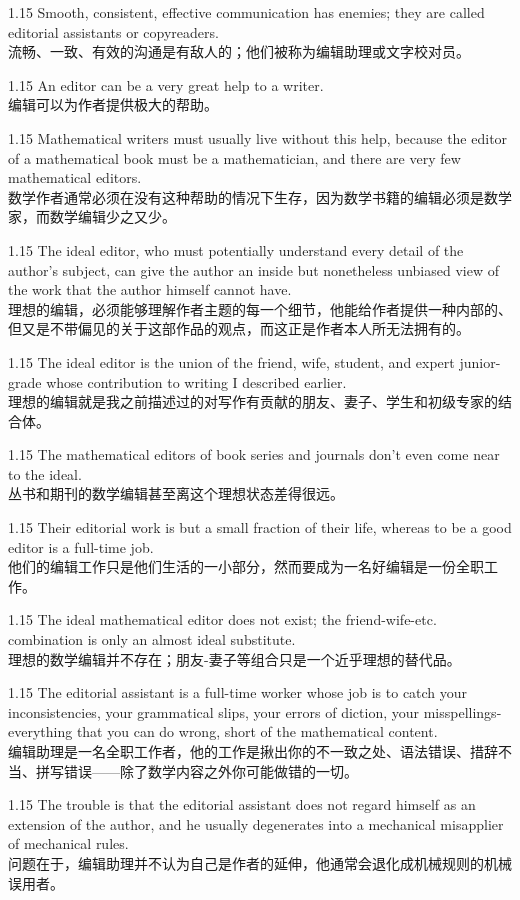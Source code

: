 \documentclass[12pt,a4paper]{article}
\newcommand{\bilingual}[2]{
    \begin{spacing}{1.15} %
        \noindent \normalsize #1 \\[-0.5ex] %
        \small \textcolor{blue!70!black}{#2} %
    \end{spacing}
    \vspace{0.8em} %
}
\begin{document}
\bilingual{Smooth, consistent, effective communication has enemies; they are called editorial assistants or copyreaders.}
{流畅、一致、有效的沟通是有敌人的；他们被称为编辑助理或文字校对员。} %

\bilingual{An editor can be a very great help to a writer.}
{编辑可以为作者提供极大的帮助。} %

\bilingual{Mathematical writers must usually live without this help, because the editor of a mathematical book must be a mathematician, and there are very few mathematical editors.}
{数学作者通常必须在没有这种帮助的情况下生存，因为数学书籍的编辑必须是数学家，而数学编辑少之又少。} %

\bilingual{The ideal editor, who must potentially understand every detail of the author's subject, can give the author an inside but nonetheless unbiased view of the work that the author himself cannot have.}
{理想的编辑，必须能够理解作者主题的每一个细节，他能给作者提供一种内部的、但又是不带偏见的关于这部作品的观点，而这正是作者本人所无法拥有的。} %

\bilingual{The ideal editor is the union of the friend, wife, student, and expert junior-grade whose contribution to writing I described earlier.}
{理想的编辑就是我之前描述过的对写作有贡献的朋友、妻子、学生和初级专家的结合体。} %

\bilingual{The mathematical editors of book series and journals don't even come near to the ideal.}
{丛书和期刊的数学编辑甚至离这个理想状态差得很远。} %

\bilingual{Their editorial work is but a small fraction of their life, whereas to be a good editor is a full-time job.}
{他们的编辑工作只是他们生活的一小部分，然而要成为一名好编辑是一份全职工作。} %

\bilingual{The ideal mathematical editor does not exist; the friend-wife-etc. combination is only an almost ideal substitute.}
{理想的数学编辑并不存在；朋友-妻子等组合只是一个近乎理想的替代品。} %

\bilingual{The editorial assistant is a full-time worker whose job is to catch your inconsistencies, your grammatical slips, your errors of diction, your misspellings-everything that you can do wrong, short of the mathematical content.}
{编辑助理是一名全职工作者，他的工作是揪出你的不一致之处、语法错误、措辞不当、拼写错误——除了数学内容之外你可能做错的一切。} %

\bilingual{The trouble is that the editorial assistant does not regard himself as an extension of the author, and he usually degenerates into a mechanical misapplier of mechanical rules.}
{问题在于，编辑助理并不认为自己是作者的延伸，他通常会退化成机械规则的机械误用者。} %
\end{document}
